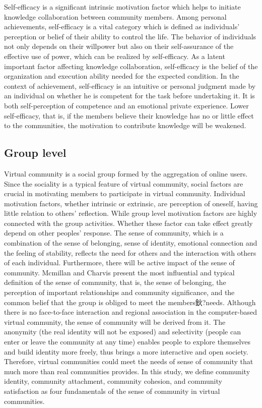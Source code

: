 \documentclass[doublespacing]{elsarticle}
\begin{document}
Self-efficacy is a significant intrinsic motivation factor which
helps to initiate knowledge collaboration between community
members.  Among personal
achievements, self-efficacy is a vital category which is defined as
individuals' perception or belief of their ability to control the
life\cite{bundura1977slt}. The behavior of individuals not only depends
on their willpower but also on their self-assurance of the effective
use of power, which can be realized by self-efficacy. As a latent
important factor affecting knowledge collaboration, self-efficacy is
the belief of the organization and execution ability needed for the
expected condition. In the context of achievement, self-efficacy is an intuitive
or personal judgment made by an individual on whether he is competent
for the task before undertaking it. It is both self-perception of
competence and an emotional private experience. Lower self-efficacy,
that is, if the members  believe their knowledge has no
or little effect to the
communities, the motivation to contribute knowledge will be
weakened\cite{1631337020050301}\cite{Hsu2007}. 

\subsection{Group level}
\label{sec:group-level}

Virtual community is a social group formed by the aggregation of
online users. Since the sociality is a typical feature of virtual
community, social factors are crucial in motivating members to
participate in virtual community. Individual motivation factors,
whether intrinsic or extrinsic, are perception of oneself, having
little relation to others' reflection. While group level motivation
factors are highly connected with the group activities. Whether these
factor can take effect  greatly depend on other peoples' response.  The sense of community, which is a
combination of the sense of belonging, sense of identity, emotional
connection and the feeling of stability, reflects the need for others
and the interaction with others of each individual. Furthermore, there
will be active impact of the sense of community. Mcmillan and Charvis
present the most influential and typical definition of the sense of
community, that is, the sense of belonging, the perception of
important relationships and community significance, and the common
belief that the group is obliged to meet the members鈥?needs\cite{mcmillan1986scd}. Although there is no face-to-face
interaction and regional association in the computer-based virtual
community, the sense of community will be derived from it. The
anonymity (the real identity will not be exposed) and selectivity
(people can enter or leave the community at any time) enables people
to explore themselves and build identity more freely, thus brings a
more interactive and open society. Therefore, virtual communities
could meet the needs of sense of community that much more than real
communities provides. In this study, we define community identity, community attachment, community cohesion, and community satisfaction as four fundamentals of the sense of community in virtual communities.      
\end{document}
